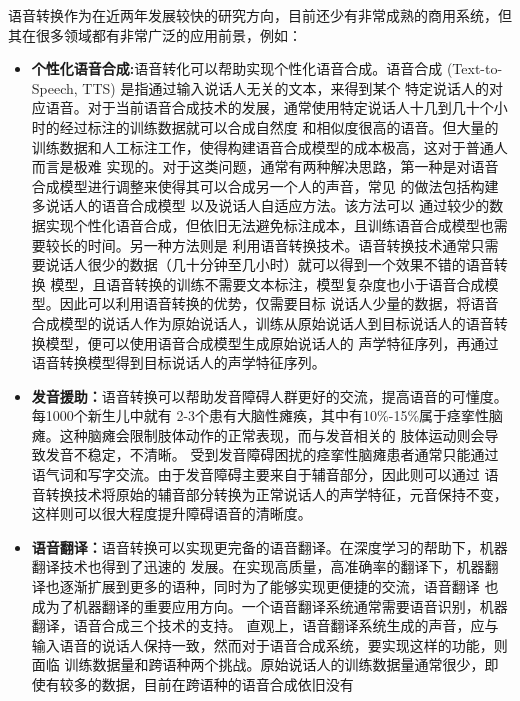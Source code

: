 语音转换作为在近两年发展较快的研究方向，目前还少有非常成熟的商用系统，但其在很多领域都有非常广泛的应用前景，例如：
\begin{itemize}
    \item \textbf{个性化语音合成:}语音转化可以帮助实现个性化语音合成。语音合成 (Text-to-Speech, TTS) 是指通过输入说话人无关的文本，来得到某个
    特定说话人的对应语音。对于当前语音合成技术的发展，通常使用特定说话人十几到几十个小时的经过标注的训练数据就可以合成自然度
    和相似度很高的语音。但大量的训练数据和人工标注工作，使得构建语音合成模型的成本极高，这对于普通人而言是极难
    实现的。对于这类问题，通常有两种解决思路，第一种是对语音合成模型进行调整来使得其可以合成另一个人的声音，常见
    的做法包括构建多说话人的语音合成模型\cite{gibiansky2017deep,ping2017deep,fan2015multi}
    以及说话人自适应方法\cite{tamura2001adaptation,wu2015study,yamagishi2009analysis}。该方法可以
    通过较少的数据实现个性化语音合成，但依旧无法避免标注成本，且训练语音合成模型也需要较长的时间。另一种方法则是
    利用语音转换技术\cite{kain1998spectral,arslan1999speaker}。语音转换技术通常只需要说话人很少的数据（几十分钟至几小时）就可以得到一个效果不错的语音转换
    模型，且语音转换的训练不需要文本标注，模型复杂度也小于语音合成模型。因此可以利用语音转换的优势，仅需要目标
    说话人少量的数据，将语音合成模型的说话人作为原始说话人，训练从原始说话人到目标说话人的语音转换模型，便可以使用语音合成模型生成原始说话人的
    声学特征序列，再通过语音转换模型得到目标说话人的声学特征序列。
    \item \textbf{发音援助：}语音转换可以帮助发音障碍人群更好的交流，提高语音的可懂度。每1000个新生儿中就有
    2-3个患有大脑性瘫痪，其中有10\%-15\%属于痉挛性脑瘫。这种脑瘫会限制肢体动作的正常表现，而与发音相关的
    肢体运动则会导致发音不稳定，不清晰\cite{hollegaard2013joint,aihara2013individuality}。
    受到发音障碍困扰的痉挛性脑瘫患者通常只能通过语气词和写字交流。由于发音障碍主要来自于辅音部分，因此则可以通过
    语音转换技术将原始的辅音部分转换为正常说话人的声学特征，元音保持不变，这样则可以很大程度提升障碍语音的清晰度。
    \item \textbf{语音翻译：}语音转换可以实现更完备的语音翻译。在深度学习的帮助下，机器翻译技术也得到了迅速的
    发展。在实现高质量，高准确率的翻译下，机器翻译也逐渐扩展到更多的语种，同时为了能够实现更便捷的交流，语音翻译
    也成为了机器翻译的重要应用方向。一个语音翻译系统通常需要语音识别，机器翻译，语音合成三个技术的支持。
    直观上，语音翻译系统生成的声音，应与输入语音的说话人保持一致，然而对于语音合成系统，要实现这样的功能，则面临
    训练数据量和跨语种两个挑战。原始说话人的训练数据量通常很少，即使有较多的数据，目前在跨语种的语音合成依旧没有

\end{itemize}
